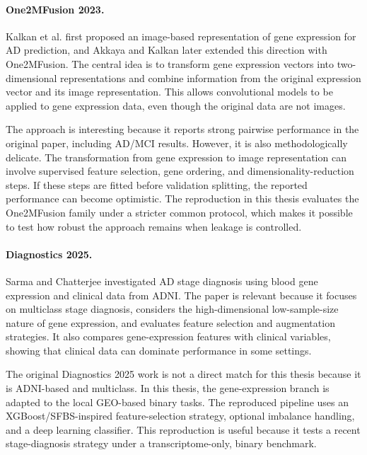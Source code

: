 \paragraph{One2MFusion 2023.}
Kalkan et al. \cite{kalkan2022image} first proposed an image-based representation of gene expression for AD prediction, and Akkaya and Kalkan \cite{akkaya2023one2mfusion} later extended this direction with One2MFusion. The central idea is to transform gene expression vectors into two-dimensional representations and combine information from the original expression vector and its image representation. This allows convolutional models to be applied to gene expression data, even though the original data are not images.

The approach is interesting because it reports strong pairwise performance in the original paper, including AD/MCI results. However, it is also methodologically delicate. The transformation from gene expression to image representation can involve supervised feature selection, gene ordering, and dimensionality-reduction steps. If these steps are fitted before validation splitting, the reported performance can become optimistic. The reproduction in this thesis evaluates the One2MFusion family under a stricter common protocol, which makes it possible to test how robust the approach remains when leakage is controlled.

\paragraph{Diagnostics 2025.}
Sarma and Chatterjee \cite{sarma2025diagnostics} investigated AD stage diagnosis using blood gene expression and clinical data from ADNI. The paper is relevant because it focuses on multiclass stage diagnosis, considers the high-dimensional low-sample-size nature of gene expression, and evaluates feature selection and augmentation strategies. It also compares gene-expression features with clinical variables, showing that clinical data can dominate performance in some settings.

The original Diagnostics 2025 work is not a direct match for this thesis because it is ADNI-based and multiclass. In this thesis, the gene-expression branch is adapted to the local GEO-based binary tasks. The reproduced pipeline uses an XGBoost/SFBS-inspired feature-selection strategy, optional imbalance handling, and a deep learning classifier. This reproduction is useful because it tests a recent stage-diagnosis strategy under a transcriptome-only, binary benchmark.

